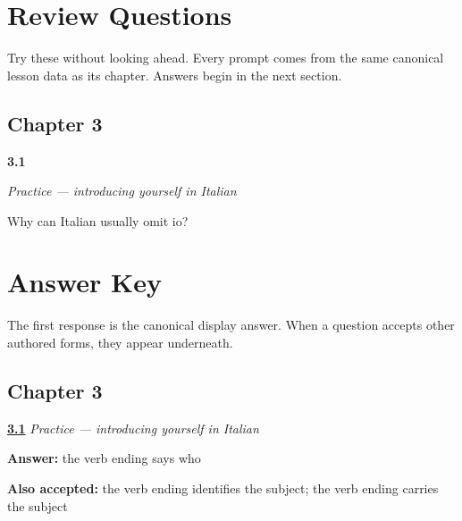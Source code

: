 
\chapter*{Review Questions}

Try these without looking ahead. Every prompt comes from the same canonical lesson data as its chapter. Answers begin in the next section.

\section*{Chapter 3}

\noindent\begin{minipage}[t]{\linewidth}
\raggedright
\hypertarget{review-IT-C03-practice-drop-io}{\textbf{3.1}} \emph{Practice — introducing yourself in Italian}\par
\small Why can Italian usually omit io?
\end{minipage}\par\medskip

\chapter*{Answer Key}

The first response is the canonical display answer. When a question accepts other authored forms, they appear underneath.

\section*{Chapter 3}

\noindent\begin{minipage}[t]{\linewidth}
\raggedright
\hyperlink{review-IT-C03-practice-drop-io}{\textbf{3.1}} \emph{Practice — introducing yourself in Italian}\par
\small \textbf{Answer:} the verb ending says who\par
\footnotesize \textbf{Also accepted:} the verb ending identifies the subject; the verb ending carries the subject
\end{minipage}\par\medskip
